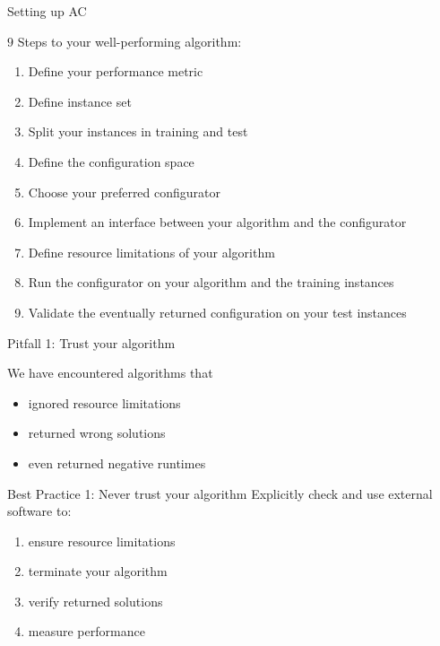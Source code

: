 \begin{frame}[c]{Setting up AC}

$9$ Steps to your well-performing algorithm:

\begin{enumerate}
	\item Define your performance metric 
	\pause
	\item Define instance set
	\pause
	\item Split your instances in training and test
	\pause
	\item Define the configuration space
	\pause
	\item Choose your preferred configurator
	\pause
	\item Implement an interface between your algorithm and the configurator
	\pause
	\item Define resource limitations of your algorithm
	\pause
	\item Run the configurator on your algorithm and the training instances
	\pause
	\item Validate the eventually returned configuration on your test instances
\end{enumerate}

\end{frame}
\begin{frame}[c]{Pitfall 1: Trust your algorithm}

We have encountered algorithms that
\begin{itemize}
	\item ignored resource limitations
	\item returned wrong solutions
	\item even returned negative runtimes
\end{itemize}

\bigskip
\pause

\begin{block}{Best Practice 1: Never trust your algorithm}
	Explicitly check and use external software to:
	\begin{enumerate}
		\item ensure resource limitations
		\item terminate your algorithm
		\item verify returned solutions
		\item measure performance 
	\end{enumerate}
\end{block}

\end{frame}

